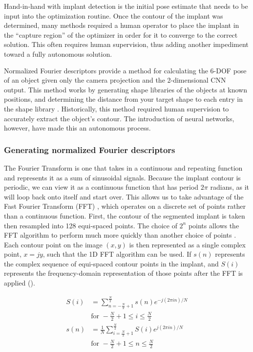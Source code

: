 Hand-in-hand with implant detection is the initial pose estimate that needs to be input into the optimization routine.
Once the contour of the implant was determined, many methods required a human operator to place the implant in the ``capture region'' of the optimizer in order for it to converge to the correct solution.
This often requires human supervision, thus adding another impediment toward a fully autonomous solution.

Normalized Fourier descriptors provide a method for calculating the 6-DOF pose of an object given only the camera projection and the 2-dimensional CNN output.
This method works by generating shape libraries of the objects at known positions, and determining the distance from your target shape to each entry in the shape library \cite{wallaceEfficientThreedimensionalAircraft1980,wallaceAnalysisThreedimensionalMovement1980,banksAccurateMeasurementThreedimensional1996}.
Historically, this method required human supervision to accurately extract the object's contour.
The introduction of neural networks, however, have made this an autonomous process.


\subsubsection{Generating normalized Fourier descriptors}
\label{sec:nfd}
The Fourier Transform is one that takes in a continuous and repeating function and represents it as a sum of sinusoidal signals.
Because the implant contour is periodic, we can view it as a continuous function that has period $2\pi$ radians, as it will loop back onto itself and start over.
This allows us to take advantage of the Fast Fourier Transform (FFT) \cite{cochranWhatFastFourier1967}, which operates on a discrete set of points rather than a continuous function.
First, the contour of the segmented implant is taken then resampled into 128 equi-spaced points.
The choice of $2^n$ points allows the FFT algorithm to perform much more quickly than another choice of points \cite{cochranWhatFastFourier1967}.
Each contour point on the image $(x, y)$ is then represented as a single complex point, $x = jy$, such that the 1D FFT algorithm can be used.
If $s(n)$ represents the complex sequence of equi-spaced contour points in the implant, and $S(i)$ represents the frequency-domain representation of those points after the FFT is applied ().

\begin{equation}
    \begin{aligned}
        S(i) &= \sum_{n = -\frac{N}{2} + 1}^{\frac{N}{2}} s(n)e^{-j(2\pi i n)/N} \\
        &\text{for } -\frac{N}{2} + 1 \le i \le \frac{N}{2} \\
        s(n) &= \frac{1}{N} \sum_{i = \frac{N}{2} + 1}^{\frac{N}{2}} S(i)e^{j(2\pi i n )/N}\\
        &\text{for } -\frac{N}{2} + 1 \le n \le \frac{N}{2}
    \end{aligned}
    \label{eq:fft}
\end{equation}

